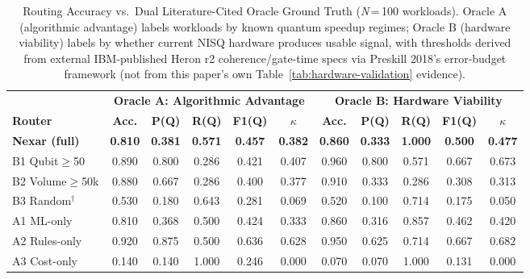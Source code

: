 \begin{table}[!t]
\caption{Routing Accuracy vs.\ Dual Literature-Cited Oracle Ground Truth (\textit{N}\,=\,100 workloads). Oracle A (algorithmic advantage) labels workloads by known quantum speedup regimes; Oracle B (hardware viability) labels by whether current NISQ hardware produces usable signal, with thresholds derived from external IBM-published Heron r2 coherence/gate-time specs via Preskill 2018's error-budget framework (not from this paper's own Table~\ref{tab:hardware-validation} evidence).}
\label{tab:routing-accuracy}
\centering
\footnotesize
\setlength{\tabcolsep}{4pt}
\begin{tabular}{l ccccc ccccc}
\toprule
 & \multicolumn{5}{c}{\textbf{Oracle A: Algorithmic Advantage}} & \multicolumn{5}{c}{\textbf{Oracle B: Hardware Viability}} \\
\cmidrule(lr){2-6}\cmidrule(lr){7-11}
\textbf{Router} & \textbf{Acc.} & \textbf{P(Q)} & \textbf{R(Q)} & \textbf{F1(Q)} & \textbf{$\kappa$} & \textbf{Acc.} & \textbf{P(Q)} & \textbf{R(Q)} & \textbf{F1(Q)} & \textbf{$\kappa$} \\
\midrule
\textbf{Nexar (full)} & \textbf{0.810} & \textbf{0.381} & \textbf{0.571} & \textbf{0.457} & \textbf{0.382} & \textbf{0.860} & \textbf{0.333} & \textbf{1.000} & \textbf{0.500} & \textbf{0.477} \\
\midrule
B1 Qubit$\geq$50 & 0.890 & 0.800 & 0.286 & 0.421 & 0.407 & 0.960 & 0.800 & 0.571 & 0.667 & 0.673 \\
B2 Volume$\geq$50k & 0.880 & 0.667 & 0.286 & 0.400 & 0.377 & 0.910 & 0.333 & 0.286 & 0.308 & 0.313 \\
B3 Random$^{\dagger}$ & 0.530 & 0.180 & 0.643 & 0.281 & 0.069 & 0.520 & 0.100 & 0.714 & 0.175 & 0.050 \\
\midrule
A1 ML-only & 0.810 & 0.368 & 0.500 & 0.424 & 0.333 & 0.860 & 0.316 & 0.857 & 0.462 & 0.420 \\
A2 Rules-only & 0.920 & 0.875 & 0.500 & 0.636 & 0.628 & 0.950 & 0.625 & 0.714 & 0.667 & 0.682 \\
A3 Cost-only & 0.140 & 0.140 & 1.000 & 0.246 & 0.000 & 0.070 & 0.070 & 1.000 & 0.131 & 0.000 \\
\bottomrule
\end{tabular}
\\[0.50em]

\end{table}
